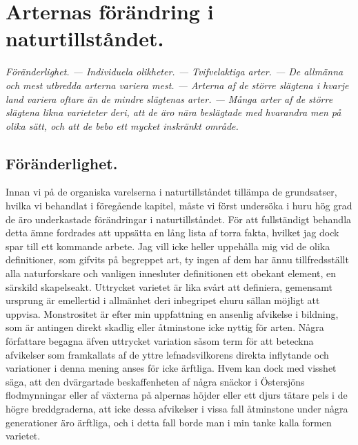 





\chapter[Naturtillståndet]{Arternas förändring i naturtillståndet.}

{\it
Föränderlighet. — Individuela olikheter. — Tvifvelaktiga arter. — De allmänna och mest utbredda arterna variera mest. — Arterna af de större slägtena i hvarje land variera oftare än de mindre slägtenas arter. — Många arter af de större slägtena likna varieteter deri, att de äro nära beslägtade med hvarandra men på olika sätt, och att de bebo ett mycket inskränkt område.
}\\[0.5cm]


\section{Föränderlighet.}

Innan vi på de organiska varelserna i naturtillståndet tillämpa de grundsatser, hvilka vi behandlat i föregående kapitel, måste vi först undersöka i huru hög grad de äro underkastade förändringar i naturtillståndet. För att fullständigt behandla detta ämne fordrades att uppsätta en lång lista af torra fakta, hvilket jag dock spar till ett kommande arbete. Jag vill icke heller uppehålla mig vid de olika definitioner, som gifvits på begreppet art, ty ingen af dem har ännu tillfredsställt alla naturforskare och vanligen innesluter definitionen ett obekant element, en särskild skapelseakt. Uttrycket varietet är lika svårt att definiera, gemensamt ursprung är emellertid i allmänhet deri inbegripet ehuru sällan möjligt att uppvisa. Monstrositet är efter min uppfattning en ansenlig afvikelse i bildning, som är antingen direkt skadlig eller åtminstone icke nyttig för arten. Några författare begagna äfven uttrycket variation såsom term för att beteckna afvikelser som framkallats af de yttre lefnadsvilkorens direkta inflytande och variationer i denna mening anses för icke ärftliga. Hvem kan dock med visshet säga, att den dvärgartade beskaffenheten af några snäckor i Östersjöns flodmynningar eller af växterna på alpernas höjder eller ett djurs tätare pels i de högre breddgraderna, att icke dessa afvikelser i vissa fall åtminstone under några generationer äro ärftliga, och i detta fall borde man i min tanke kalla formen varietet.

